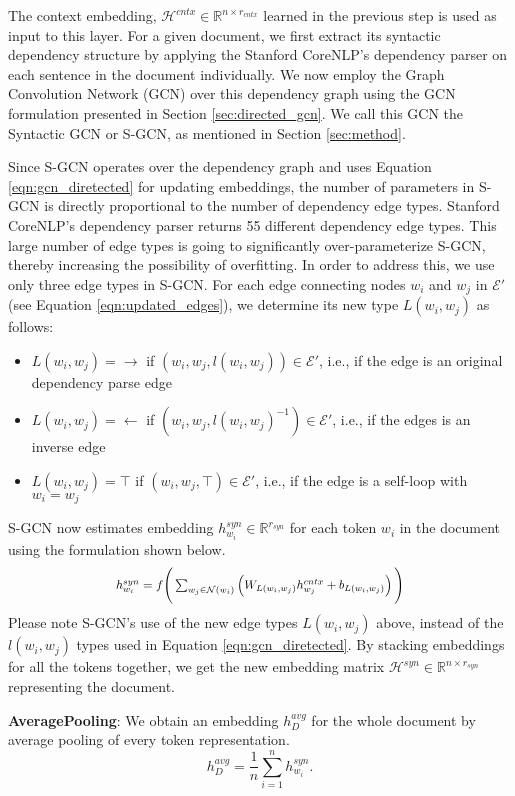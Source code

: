 \documentclass[11pt,a4paper]{article}
\newcommand{\refeqn}[1]{Equation \ref{#1}}
\newcommand{\refsec}[1]{Section \ref{#1}}
\newcommand{\m}[1]{\mathcal{#1}}
\newcommand*{\Scale}[2][4]{\scalebox{#1}{$#2$}}\newcommand*{\Resize}[2]{\resizebox{#1}{!}{$#2$}}
\begin{document}
The context embedding, $\m{H}^{cntx} \in \mathbb{R}^{n \times r_{cntx}}$ learned in the previous step is used as input to this layer. For a given document, we first extract its syntactic dependency structure by applying the Stanford CoreNLP's dependency parser \cite{stanford_corenlp} on each sentence in the document individually. We now employ the Graph Convolution Network (GCN) over this dependency graph using the GCN formulation presented in \refsec{sec:directed_gcn}. We call this GCN the Syntactic GCN or S-GCN, as mentioned in \refsec{sec:method}.

Since S-GCN operates over the dependency graph and uses \refeqn{eqn:gcn_diretected} for updating embeddings, the number of parameters in S-GCN is directly proportional to the number of dependency edge types. Stanford CoreNLP's dependency parser returns 55 different dependency edge types. This large number of edge types is going to significantly over-parameterize S-GCN, thereby increasing the possibility of overfitting. In order to address this, we use only three edge types in S-GCN. For each edge connecting nodes $w_i$ and $w_j$ in $\m{E'}$ (see \refeqn{eqn:updated_edges}), we determine its new type $L(w_i, w_j)$ as follows:
\begin{itemize}
	\item $L(w_i, w_j) = \rightarrow$ if $(w_i, w_j, l(w_i, w_j)) \in \m{E'}$, i.e., if the edge is an original dependency parse edge
	\item $L(w_i, w_j) = \leftarrow$ if $(w_i, w_j, l(w_i, w_j)^{-1}) \in \m{E'}$, i.e., if the edges is an inverse edge	
	\item $L(w_i, w_j) = \top$ if $(w_i, w_j, \top) \in \m{E'}$, i.e., if the edge is a self-loop with $w_i = w_j$
\end{itemize}
S-GCN now estimates embedding $h^{syn}_{w_{i}} \in \mathbb{R}^{r_{syn}}$ for each token $w_{i}$ in the document using the formulation shown below.
\[
\Scale[0.88]{h^{syn}_{w_i} = f \Bigg(\sum_{w_j \in \m{N}(w_i)}\left(W_{L(w_i, w_j)}h^{cntx}_{w_j} + b_{L(w_i, w_j)}\right) \Bigg)}
\]
Please note S-GCN's use of the new edge types $L(w_i, w_j)$  above, instead of the $l(w_i, w_j)$ types used in \refeqn{eqn:gcn_diretected}. By stacking embeddings for all the tokens together, we get the new embedding matrix $\m{H}^{syn} \in \mathbb{R}^{n \times r_{syn}}$ representing the document.







\textbf{AveragePooling}: We obtain an embedding $h_{D}^{avg}$ for the whole document by average pooling of every token representation.
\begin{equation}
h_{D}^{avg} = \frac{1}{n} \sum_{i = 1}^{n} h_{w_i}^{syn}
\label{eqn:avg-pool}.
\end{equation}
\end{document}
